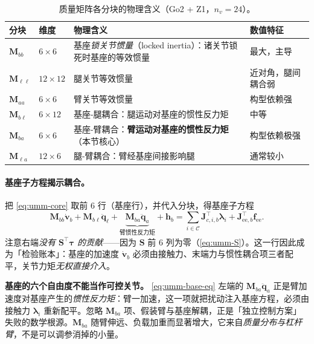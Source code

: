 \begin{table}[H]\centering\small
\caption{质量矩阵各分块的物理含义（Go2 + Z1，$n_v=24$）。}
\label{tab:umm-mblocks}
\begin{tabular}{llll}
\toprule
分块 & 维度 & 物理含义 & 数值特征 \\
\midrule
$\mathbf M_{bb}$ & $6\times6$ & 基座\emph{锁关节惯量}（locked inertia）：诸关节锁死时基座的等效惯量 & 最大，主导 \\
$\mathbf M_{\ell\ell}$ & $12\times12$ & 腿关节等效惯量 & 近对角，腿间耦合弱 \\
$\mathbf M_{aa}$ & $6\times6$ & 臂关节等效惯量 & 构型依赖强 \\
$\mathbf M_{b\ell}$ & $6\times12$ & 基座-腿耦合：腿运动对基座的惯性反力矩 & 中等 \\
$\mathbf M_{ba}$ & $6\times6$ & 基座-臂耦合：\textbf{臂运动对基座的惯性反力矩}（本节核心） & 构型依赖极强 \\
$\mathbf M_{\ell a}$ & $12\times6$ & 腿-臂耦合：臂经基座间接影响腿 & 通常较小 \\
\bottomrule
\end{tabular}
\end{table}

\paragraph{基座子方程揭示耦合。}
把 \cref{eq:umm-core} 取前 $6$ 行（基座行），并代入分块，得基座子方程
\begin{equation}
  \mathbf M_{bb}\dot{\mathbf v}_b+\mathbf M_{b\ell}\ddot{\mathbf q}_\ell+\underbrace{\mathbf M_{ba}\ddot{\mathbf q}_a}_{\text{臂惯性反力矩}}+\mathbf h_b
  =\sum_{i\in\mathcal C}\mathbf J_{c,i,b}^\top\boldsymbol\lambda_i+\mathbf J_{\text{ee},b}^\top\mathbf f_{\text{ee}}.
  \label{eq:umm-base-eq}
\end{equation}
注意右端\emph{没有 $\mathbf S^\top\boldsymbol\tau$ 的贡献}——因为 $\mathbf S$ 前 $6$ 列为零（\cref{eq:umm-S}）。这一行因此成为「检验账本」：基座的加速度 $\dot{\mathbf v}_b$ 必须由接触力、末端力与惯性耦合项三者配平，关节力矩\emph{无权直接介入}。

\begin{insight}
\textbf{基座的六个自由度不能当作可控关节。}\;
\cref{eq:umm-base-eq} 左端的 $\mathbf M_{ba}\ddot{\mathbf q}_a$ 正是臂加速度对基座产生的\emph{惯性反力矩}：臂一加速，这一项就把扰动注入基座方程，必须由接触力 $\boldsymbol\lambda_i$ 重新配平。忽略 $\mathbf M_{ba}$ 项、假装臂与基座解耦，正是「独立控制方案」失败的数学根源。$\mathbf M_{ba}$ 随臂伸远、负载加重而显著增大，它来自\emph{质量分布与杠杆臂}，不是可以调参消掉的小量。
\end{insight}

